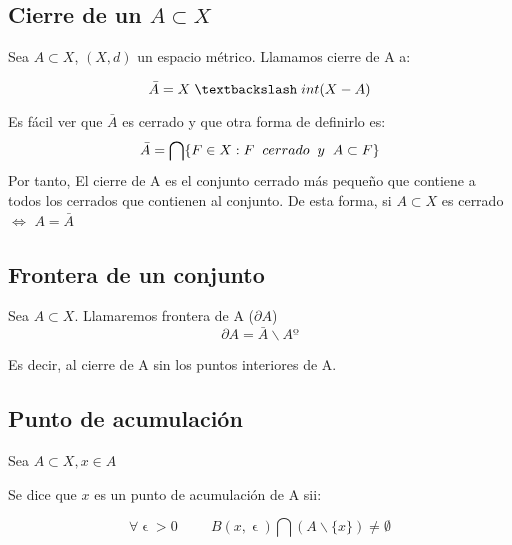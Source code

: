 \documentclass[11pt]{article}
\begin{document}
\subsection*{Cierre de un $A \subset X$}

Sea $A \subset X$, $(X,d)$ un espacio métrico. Llamamos cierre de A a:

\[
\bar{A} = X \hspace{0.1cm}\textbackslash \hspace{0.1cm} int(X-A)
\]

Es fácil ver que $\bar{A}$ es cerrado y que otra forma de definirlo es:
\[
\bar{A} = \bigcap \{F\in X: F \hspace{0.2cm} cerrado \hspace{0.2cm}y \hspace{0.2cm} A\subset F\}
\]
Por tanto, El cierre de A es el conjunto cerrado más pequeño que contiene a todos los cerrados que contienen al conjunto. De esta forma, si $A\subset X$ es cerrado $\Leftrightarrow$ $A = \bar{A}$



\subsection*{Frontera de un conjunto}

Sea $A\subset X$. Llamaremos frontera de A ($\partial A$)
\[
\partial A = \bar{A} \backslash Aº
\]

Es decir, al cierre de A sin los puntos interiores de A.


\subsection*{Punto de acumulación}

Sea $A \subset X, x \in A$

Se dice que $x$ es un punto de acumulación de A sii:

\[
\forall \upvarepsilon > 0 \hspace{1cm} B(x,\upvarepsilon)\bigcap(A\backslash \{x\}) \neq \emptyset
\]
\end{document}
